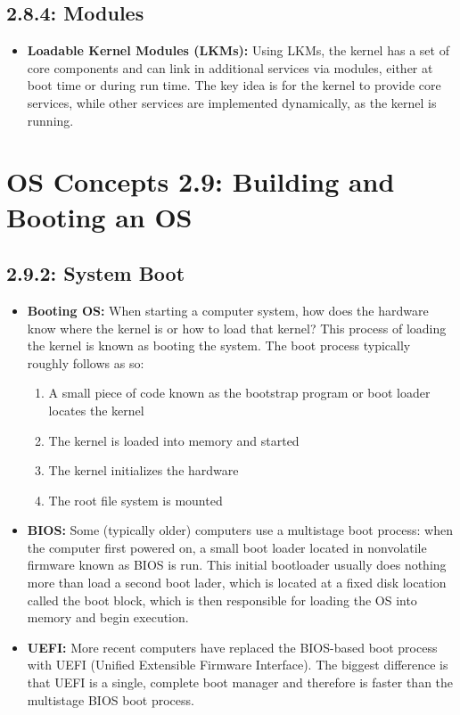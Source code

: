 \documentclass[12pt]{article}
\begin{document}
\subsection*{2.8.4: Modules}

\begin{itemize}
    \item \textbf{Loadable Kernel Modules (LKMs):} Using LKMs, the kernel has a set of core components and can link in additional services via modules, either at boot time or during run time. The key idea is for the kernel to provide core services, while other services are implemented dynamically, as the kernel is running.
\end{itemize}

\section*{OS Concepts 2.9: Building and Booting an OS}

\subsection*{2.9.2: System Boot}

\begin{itemize}
    \item \textbf{Booting OS:} When starting a computer system, how does the hardware know where the kernel is or how to load that kernel? This process of loading the kernel is known as booting the system. The boot process typically roughly follows as so:
    \begin{enumerate}
        \item A small piece of code known as the bootstrap program or boot loader locates the kernel
        \item The kernel is loaded into memory and started
        \item The kernel initializes the hardware
        \item The root file system is mounted
    \end{enumerate}
    \item \textbf{BIOS:} Some (typically older) computers use a multistage boot process: when the computer first powered on, a small boot loader located in nonvolatile firmware known as BIOS is run. This initial bootloader usually does nothing more than load a second boot lader, which is located at a fixed disk location called the boot block, which is then responsible for loading the OS into memory and begin execution.
    \item \textbf{UEFI:} More recent computers have replaced the BIOS-based boot process with UEFI (Unified Extensible Firmware Interface). The biggest difference is that UEFI is a single, complete boot manager and therefore is faster than the multistage BIOS boot process.
\end{itemize}
\end{document}
